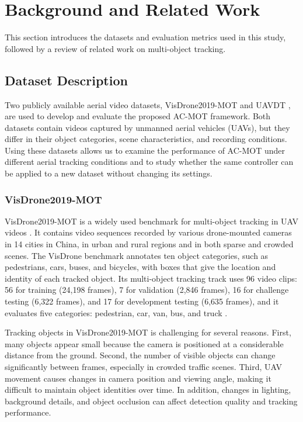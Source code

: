 \documentclass[pdflatex,sn-mathphys-num,iicol]{sn-jnl}
\begin{document}
\section{Background and Related Work}\label{sec:related}
This section introduces the datasets and evaluation metrics used in this study, followed by a review of related work on multi-object tracking.

\subsection{Dataset Description}\label{sec:datasets}
Two publicly available aerial video datasets, VisDrone2019-MOT
\cite{zhu2022visdrone} and UAVDT \cite{du2018uavdt}, are used to develop and evaluate the proposed AC-MOT framework. Both datasets contain videos captured by unmanned aerial vehicles (UAVs), but they differ in their object categories, scene characteristics, and recording conditions. Using these datasets allows us to examine the performance of AC-MOT under different aerial tracking conditions and to study whether the same controller can be applied to a new dataset without changing its settings.

\subsubsection{VisDrone2019-MOT}
VisDrone2019-MOT is a widely used benchmark for multi-object tracking in UAV
videos \cite{zhu2022visdrone}. It contains video sequences recorded by various
drone-mounted cameras in 14 cities in China, in urban and rural regions and in
both sparse and crowded scenes. The VisDrone benchmark annotates ten object
categories, such as pedestrians, cars, buses, and bicycles, with boxes that
give the location and identity of each tracked object. Its multi-object
tracking track uses 96 video clips: 56 for training (24,198 frames), 7 for
validation (2,846 frames), 16 for challenge testing (6,322 frames), and 17 for
development testing (6,635 frames), and it evaluates five categories:
pedestrian, car, van, bus, and truck \cite{zhu2022visdrone}.

Tracking objects in VisDrone2019-MOT is challenging for several reasons. First, many objects appear small because the camera is positioned at a considerable distance from the ground. Second, the number of visible objects can change significantly between frames, especially in crowded traffic scenes. Third, UAV movement causes changes in camera position and viewing angle, making it difficult to maintain object identities over time. In addition, changes in lighting, background details, and object occlusion can affect detection quality and tracking performance.
\end{document}
